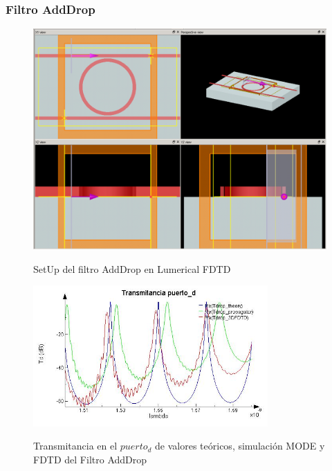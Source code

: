 \subsubsection{Filtro AddDrop}

\begin{figure}[H]
\caption{SetUp del filtro AddDrop en Lumerical FDTD}
\centering
\includegraphics[width=1.0\textwidth,natwidth=1074,natheight=808]{figs/lum_setup_ad.PNG}
\label{fig:lum_setup_ad}
\end{figure} 

\begin{figure}[H]
\caption{Transmitancia en el $puerto_d$ de valores teóricos, simulación MODE y 
FDTD del Filtro AddDrop}
\centering
\includegraphics[width=0.8\textwidth,natwidth=593,natheight=356]{figs/lum_Td.jpg}
\label{fig:lum_td_ad}
\end{figure} 

